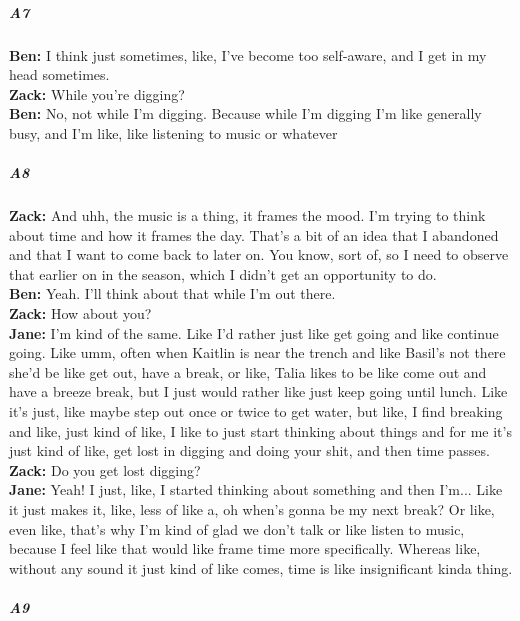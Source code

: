 \documentclass[
]{article}
\begin{document}
\subparagraph{A7}\label{sec-A7}

\textbf{Ben:} I think just sometimes, like, I've become too self-aware,
and I get in my head sometimes.\\
\textbf{Zack:} While you're digging?\\
\textbf{Ben:} No, not while I'm digging. Because while I'm digging I'm
like generally busy, and I'm like, like listening to music or whatever

\subparagraph{A8}\label{sec-A8}

\textbf{Zack:} And uhh, the music is a thing, it frames the mood. I'm
trying to think about time and how it frames the day. That's a bit of an
idea that I abandoned and that I want to come back to later on. You
know, sort of, so I need to observe that earlier on in the season, which
I didn't get an opportunity to do.\\
\textbf{Ben:} Yeah. I'll think about that while I'm out there.\\
\textbf{Zack:} How about you?\\
\textbf{Jane:} I'm kind of the same. Like I'd rather just like get going
and like continue going. Like umm, often when Kaitlin is near the trench
and like Basil's not there she'd be like get out, have a break, or like,
Talia likes to be like come out and have a breeze break, but I just
would rather like just keep going until lunch. Like it's just, like
maybe step out once or twice to get water, but like, I find breaking and
like, just kind of like, I like to just start thinking about things and
for me it's just kind of like, get lost in digging and doing your shit,
and then time passes.\\
\textbf{Zack:} Do you get lost digging?\\
\textbf{Jane:} Yeah! I just, like, I started thinking about something
and then I'm... Like it just makes it, like, less of like a, oh when's
gonna be my next break? Or like, even like, that's why I'm kind of glad
we don't talk or like listen to music, because I feel like that would
like frame time more specifically. Whereas like, without any sound it
just kind of like comes, time is like insignificant kinda thing.

\subparagraph{A9}\label{sec-A9}
\end{document}
